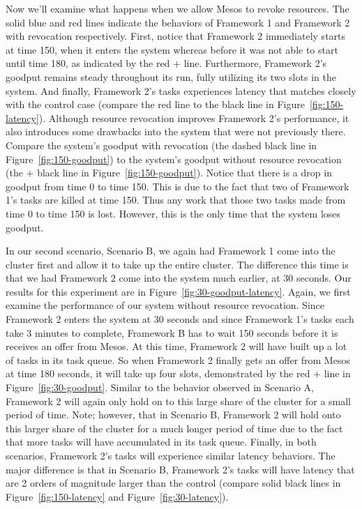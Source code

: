 Now we'll examine what happens when we allow Mesos to revoke resources. The solid blue and red lines
indicate the behaviors of Framework 1 and Framework 2 with revocation respectively. First, notice that
Framework 2 immediately starts at time 150, when it enters the system whereas before it was not able
to start until time 180, as indicated by the red $+$ line. Furthermore, Framework 2's goodput remains
steady throughout its run, fully utilizing its two slots in the system. And finally, Framework 2's tasks
experiences latency that matches closely with the control case (compare the red line to the black line
in Figure~\ref{fig:150-latency}). Although resource revocation improves Framework 2's performance, it 
also introduces some drawbacks into the system that were not previously there. Compare the system's 
goodput with revocation (the dashed black line in Figure~\ref{fig:150-goodput}) to the system's goodput
without resource revocation (the $+$ black line in Figure~\ref{fig:150-goodput}). Notice that there is a
drop in goodput from time 0 to time 150. This is due to the fact that two of Framework 1's tasks are 
killed at time 150. Thus any work that those two tasks made from time 0 to time 150 is lost. However,
this is the only time that the system loses goodput.

In our second scenario, Scenario B, we again had Framework 1 come into the cluster first and allow it
to take up the entire cluster. The difference this time is that we had Framework 2 come into the system
much earlier, at 30 seconds. Our results for this experiment are in Figure~\ref{fig:30-goodput-latency}.
Again, we first examine the performance of our system without resource revocation. Since Framework 2
enters the system at 30 seconds and since Framework 1's tasks each take 3 minutes to complete, Framework
B has to wait 150 seconds before it is receives an offer from Mesos. At this time, Framework 2 will have
built up a lot of tasks in its task queue. So when Framework 2 finally gets an offer from Mesos at time
180 seconds, it will take up four slots, demonstrated by the red $+$ line in 
Figure~\ref{fig:30-goodput}. Similar to the behavior observed in Scenario A, Framework 2 will again
only hold on to this large share of the cluster for a small period of time. Note; however, that in
Scenario B, Framework 2 will hold onto this larger share of the cluster for a much longer period of 
time due to the fact that more tasks will have accumulated in its task queue. Finally, in both
scenarios, Framework 2's tasks will experience similar latency behaviors. The major difference is that
in Scenario B, Framework 2's tasks will have latency that are 2 orders of magnitude larger than the
control (compare solid black lines in Figure~\ref{fig:150-latency} and Figure~\ref{fig:30-latency}).

